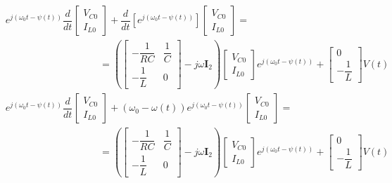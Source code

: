 \begin{example}
\begin{align}
	 & e^{j\left(\omega_0 t - \psi(t)\right)}\dfrac{d}{dt} \left[ \begin{array}{l} V_{C0} \\[3mm] I_{L0} \end{array}\right] + \dfrac{d}{dt}\left[e^{j\left(\omega_0 t - \psi(t)\right)} \right] \left[ \begin{array}{l} V_{C0} \\[3mm] I_{L0} \end{array}\right] = \nonumber\\[3mm] &\hspace{4cm} = \left(\left[\begin{array}{cc} -\dfrac{1}{RC} & \dfrac{1}{C} \\[5mm] - \dfrac{1}{L} & 0 \end{array}\right] - j\omega \mathbf{I}_2\right) \left[ \begin{array}{l} V_{C0} \\[3mm] I_{L0} \end{array}\right]e^{j\left(\omega_0 t - \psi(t)\right)} + \left[\begin{array}{c} 0 \\[3mm] -\dfrac{1}{L}\end{array}\right] V(t) \nonumber\\[3mm]
	 & e^{j\left(\omega_0 t - \psi(t)\right)}\dfrac{d}{dt} \left[ \begin{array}{l} V_{C0} \\[3mm] I_{L0} \end{array}\right] + \left(\omega_0 - \omega(t)\right)e^{j\left(\omega_0 t - \psi(t)\right)} \left[ \begin{array}{l} V_{C0} \\[3mm] I_{L0} \end{array}\right] = \nonumber\\[3mm] &\hspace{4cm} = \left(\left[\begin{array}{cc} -\dfrac{1}{RC} & \dfrac{1}{C} \\[5mm] - \dfrac{1}{L} & 0 \end{array}\right] - j\omega \mathbf{I}_2\right) \left[ \begin{array}{l} V_{C0} \\[3mm] I_{L0} \end{array}\right]e^{j\left(\omega_0 t - \psi(t)\right)} + \left[\begin{array}{c} 0 \\[3mm] -\dfrac{1}{L}\end{array}\right] V(t) \nonumber\\[3mm]

\end{align}
\end{example}
